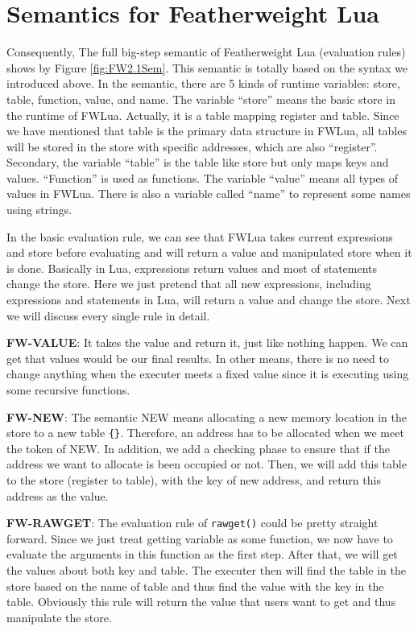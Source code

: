 \section{Semantics for Featherweight Lua}\label{sec: FWLUAsemantic}
Consequently, The full big-step semantic of Featherweight Lua (evaluation rules) shows by Figure \ref{fig:FW2.1Sem}. This semantic is totally based on the syntax we introduced above. In the semantic, there are 5 kinds of runtime variables: store, table, function, value, and name. The variable ``store'' means the basic store in the runtime of FWLua. Actually, it is a table mapping register and table. Since we have mentioned that table is the primary data structure in FWLua, all tables will be stored in the store with specific addresses, which are also ``register''. Secondary, the variable ``table'' is the table like store but only maps keys and values. ``Function'' is used as functions. The variable ``value'' means all types of values in FWLua. There is also a variable called ``name'' to represent some names using strings.

In the basic evaluation rule, we can see that FWLua takes current expressions and store before evaluating and will return a value and manipulated store when it is done. Basically in Lua, expressions return values and most of statements change the store. Here we just pretend that all new expressions, including expressions and statements in Lua, will return a value and change the store. Next we will discuss every single rule in detail.

{\bf FW-VALUE}: It takes the value and return it, just like nothing happen. We can get that values would be our final results. In other means, there is no need to change anything when the executer meets a fixed value since it is executing using some recursive functions. 

{\bf FW-NEW}: The semantic NEW means allocating a new memory location in the store to a new table {\tt \{\}}. Therefore, an address has to be allocated when we meet the token of NEW. In addition, we add a checking phase to ensure that if the address we want to allocate is been occupied or not. Then, we will add this table to the store (register to table), with the key of new address, and return this address as the value.

{\bf FW-RAWGET}: The evaluation rule of {\tt rawget()} could be pretty straight forward. Since we just treat getting variable as some function, we now have to evaluate the arguments in this function as the first step. After that, we will get the values about both key and table. The executer then will find the table in the store based on the name of table and thus find the value with the key in the table. Obviously this rule will return the value that users want to get and thus manipulate the store.

